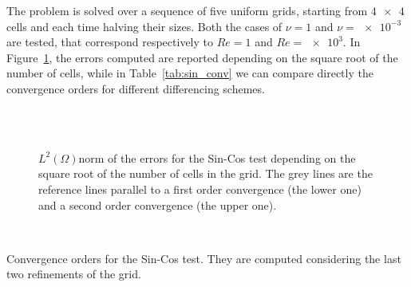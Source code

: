 The problem is solved over a sequence of five uniform grids, starting from 
$\num{4x4}$ cells and each time halving their sizes. Both the cases of $\nu=1$ 
and $\nu=\num{e-3}$ are tested, that correspond respectively to $Re=1$ and 
$Re=\num{e3}$. In Figure~\ref{fig:sin_err}, the errors computed are reported 
depending on the square root of the number of cells, while in 
Table~\ref{tab:sin_conv} we can compare directly the 
convergence orders for different differencing schemes.
\begin{figure}
	\centering
	\subfloat[Upwind, $Re = 1$]{
		}
	\subfloat[Upwind, $Re = \num{e3}$]{
		}\\
	\subfloat[Min-Mod, $Re = 1$]{
		}
	\subfloat[Min-Mod, $Re = \num{e3}$]{
		}\\
	\subfloat[Van Leer, $Re = 1$]{
		}
	\subfloat[Van Leer, $Re = \num{e3}$]{
		\label{fig:sin_err_vl_hre}}
	\caption[$L^2(\Omega)$ norm of the errors for the Sin-Cos 
	test]{$L^2(\Omega)$norm of the errors 
	for the Sin-Cos 
	test depending on the square root of the number of cells in the grid. 
	The grey lines are the reference lines parallel to a first order convergence (the lower one) and a
	second order convergence (the upper one).}
	\label{fig:sin_err}
\end{figure}

\begin{table}
	\centering
	\\
	\caption[Convergence orders for the Sin-Cos test]{Convergence orders for 
	the Sin-Cos test. They are computed considering the last two refinements of 
	the grid.}
	\label{tab:sin_conv}
\end{table}

